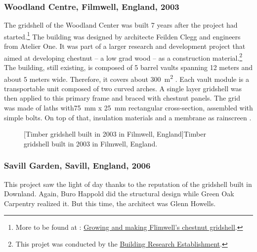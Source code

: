 \subsubsection{Woodland Centre, Filmwell, England, 2003}
The gridshell of the Woodland Center was built 7 years after the project had started.\footnote{More to be found at : \href{http://www.fourthdoor.org/annular/?page_id=441}{Growing and making Flimwell’s chestnut gridshell}.} The building was designed by architecte Feilden Clegg and engineers from Atelier One. It was part of a larger research and development project that aimed at developing chestnut -- a low grad wood -- as a construction material.\footnote{This projet was conducted by the \href{http://www.bre.co.uk/}{Building Research Establishment}.} The building, still existing, is composed of 5 barrel vaults spanning 12 meters and about 5 meters wide. Therefore, it covers about \SI{300}{m^2} \cite{Lowenstein2004}. Each vault module is a transportable unit composed of two curved arches. A single layer gridshell was then applied to this primary frame and braced with chestnut panels. The grid was made of laths with\SI{75}{mm} x \SI{25}{mm} rectangular cross-section, assembled with simple bolts. On top of that, insulation materials and a membrane as rainscreen \cite{FourthDoor2003}.
 \begin{figure}[h]
		\hspace*{\fill}
		\vspace{10pt}
		[Timber gridshell built in 2003 in Filmwell, England]{Timber gridshell built in 2003 in Filmwell, England.}
		\label{fig:flimwell} 
\end{figure}

\subsubsection{Savill Garden, Savill, England, 2006}

This project saw the light of day thanks to the reputation of the gridshell built in Downland. Again, Buro Happold did the structural design while Green Oak Carpentry realized it. But this time, the architect was Glenn Howells.

